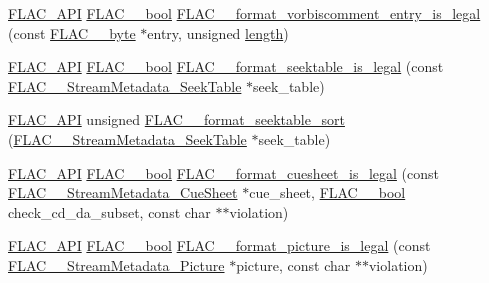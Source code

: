 \begin{DoxyCompactItemize}
\item 
\mbox{\hyperlink{group__flac__export_ga56ca07df8a23310707732b1c0007d6f5}{F\+L\+A\+C\+\_\+\+A\+PI}} \mbox{\hyperlink{ordinals_8h_a95103469f1cbd78b8cf250194985b34e}{F\+L\+A\+C\+\_\+\+\_\+bool}} \mbox{\hyperlink{group__flac__format_ga6878e238052fc0f7109b55129d64b4e5}{F\+L\+A\+C\+\_\+\+\_\+format\+\_\+vorbiscomment\+\_\+entry\+\_\+is\+\_\+legal}} (const \mbox{\hyperlink{ordinals_8h_a5eb569b12d5b047cdacada4d57924ee3}{F\+L\+A\+C\+\_\+\+\_\+byte}} $\ast$entry, unsigned \mbox{\hyperlink{_s_d_l__opengl__glext_8h_ab9c919755bde3b34349e23a32b4e0fa7}{length}})
\item 
\mbox{\hyperlink{group__flac__export_ga56ca07df8a23310707732b1c0007d6f5}{F\+L\+A\+C\+\_\+\+A\+PI}} \mbox{\hyperlink{ordinals_8h_a95103469f1cbd78b8cf250194985b34e}{F\+L\+A\+C\+\_\+\+\_\+bool}} \mbox{\hyperlink{group__flac__format_ga02270d9b92dbe7617635c65a1d0f58ff}{F\+L\+A\+C\+\_\+\+\_\+format\+\_\+seektable\+\_\+is\+\_\+legal}} (const \mbox{\hyperlink{struct_f_l_a_c_____stream_metadata___seek_table}{F\+L\+A\+C\+\_\+\+\_\+\+Stream\+Metadata\+\_\+\+Seek\+Table}} $\ast$seek\+\_\+table)
\item 
\mbox{\hyperlink{group__flac__export_ga56ca07df8a23310707732b1c0007d6f5}{F\+L\+A\+C\+\_\+\+A\+PI}} unsigned \mbox{\hyperlink{group__flac__format_gad1b0090d45a6d65a696a81261bd7fbf6}{F\+L\+A\+C\+\_\+\+\_\+format\+\_\+seektable\+\_\+sort}} (\mbox{\hyperlink{struct_f_l_a_c_____stream_metadata___seek_table}{F\+L\+A\+C\+\_\+\+\_\+\+Stream\+Metadata\+\_\+\+Seek\+Table}} $\ast$seek\+\_\+table)
\item 
\mbox{\hyperlink{group__flac__export_ga56ca07df8a23310707732b1c0007d6f5}{F\+L\+A\+C\+\_\+\+A\+PI}} \mbox{\hyperlink{ordinals_8h_a95103469f1cbd78b8cf250194985b34e}{F\+L\+A\+C\+\_\+\+\_\+bool}} \mbox{\hyperlink{group__flac__format_gae922cabe2dc3f81af10cb635cf996114}{F\+L\+A\+C\+\_\+\+\_\+format\+\_\+cuesheet\+\_\+is\+\_\+legal}} (const \mbox{\hyperlink{struct_f_l_a_c_____stream_metadata___cue_sheet}{F\+L\+A\+C\+\_\+\+\_\+\+Stream\+Metadata\+\_\+\+Cue\+Sheet}} $\ast$cue\+\_\+sheet, \mbox{\hyperlink{ordinals_8h_a95103469f1cbd78b8cf250194985b34e}{F\+L\+A\+C\+\_\+\+\_\+bool}} check\+\_\+cd\+\_\+da\+\_\+subset, const char $\ast$$\ast$violation)
\item 
\mbox{\hyperlink{group__flac__export_ga56ca07df8a23310707732b1c0007d6f5}{F\+L\+A\+C\+\_\+\+A\+PI}} \mbox{\hyperlink{ordinals_8h_a95103469f1cbd78b8cf250194985b34e}{F\+L\+A\+C\+\_\+\+\_\+bool}} \mbox{\hyperlink{group__flac__format_gaf90af7bc6ece6f28063b08e9aa6b4077}{F\+L\+A\+C\+\_\+\+\_\+format\+\_\+picture\+\_\+is\+\_\+legal}} (const \mbox{\hyperlink{struct_f_l_a_c_____stream_metadata___picture}{F\+L\+A\+C\+\_\+\+\_\+\+Stream\+Metadata\+\_\+\+Picture}} $\ast$picture, const char $\ast$$\ast$violation)
\end{DoxyCompactItemize}
